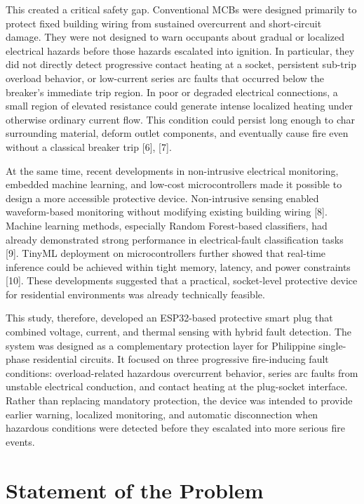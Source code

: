 This created a critical safety gap. Conventional MCBs were designed
primarily to protect fixed building wiring from sustained overcurrent
and short-circuit damage. They were not designed to warn occupants about
gradual or localized electrical hazards before those hazards escalated
into ignition. In particular, they did not directly detect progressive
contact heating at a socket, persistent sub-trip overload behavior, or
low-current series arc faults that occurred below the breaker's
immediate trip region. In poor or degraded electrical connections, a
small region of elevated resistance could generate intense localized
heating under otherwise ordinary current flow. This condition could
persist long enough to char surrounding material, deform outlet
components, and eventually cause fire even without a classical breaker
trip {[}6{]}, {[}7{]}.

At the same time, recent developments in non-intrusive electrical
monitoring, embedded machine learning, and low-cost microcontrollers
made it possible to design a more accessible protective device.
Non-intrusive sensing enabled waveform-based monitoring without
modifying existing building wiring {[}8{]}. Machine learning methods,
especially Random Forest-based classifiers, had already demonstrated
strong performance in electrical-fault classification tasks {[}9{]}.
TinyML deployment on microcontrollers further showed that real-time
inference could be achieved within tight memory, latency, and power
constraints {[}10{]}. These developments suggested that a practical,
socket-level protective device for residential environments was already
technically feasible.

This study, therefore, developed an ESP32-based protective smart plug that
combined voltage, current, and thermal sensing with hybrid fault
detection. The system was designed as a complementary protection layer
for Philippine single-phase residential circuits. It focused on three
progressive fire-inducing fault conditions: overload-related hazardous
overcurrent behavior, series arc faults from unstable electrical
conduction, and contact heating at the plug-socket interface. Rather
than replacing mandatory protection, the device was intended to provide
earlier warning, localized monitoring, and automatic disconnection when
hazardous conditions were detected before they escalated into more
serious fire events.

\section{Statement of the Problem}\label{statement-of-the-problem}

